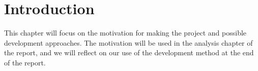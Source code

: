\chapter{Introduction}
\label{cha:introduction}

This chapter will focus on the motivation for making the project and possible development approaches. The motivation will be used in the analysis chapter of the report, and we will reflect on our use of the development method at the end of the report.\newpage

%

